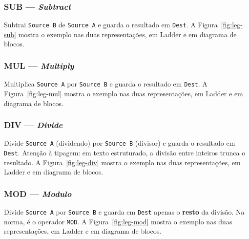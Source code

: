 \subsubsection{SUB --- \emph{Subtract}}

Subtrai \texttt{Source B} de \texttt{Source A} e guarda o resultado em \texttt{Dest}.
A Figura~\ref{fig:leg-sub} mostra o exemplo nas duas representações, em Ladder e em diagrama de blocos.


\subsubsection{MUL --- \emph{Multiply}}

Multiplica \texttt{Source A} por \texttt{Source B} e guarda o resultado em \texttt{Dest}.
A Figura~\ref{fig:leg-mul} mostra o exemplo nas duas representações, em Ladder e em diagrama de blocos.


\subsubsection{DIV --- \emph{Divide}}

Divide \texttt{Source A} (dividendo) por \texttt{Source B} (divisor) e guarda o resultado em
\texttt{Dest}. Atenção à tipagem: em texto estruturado, a divisão entre inteiros trunca o resultado.
A Figura~\ref{fig:leg-div} mostra o exemplo nas duas representações, em Ladder e em diagrama de blocos.


\subsubsection{MOD --- \emph{Modulo}}

Divide \texttt{Source A} por \texttt{Source B} e guarda em \texttt{Dest} apenas o \textbf{resto} da
divisão. Na norma, é o operador \texttt{MOD}.
A Figura~\ref{fig:leg-mod} mostra o exemplo nas duas representações, em Ladder e em diagrama de blocos.

